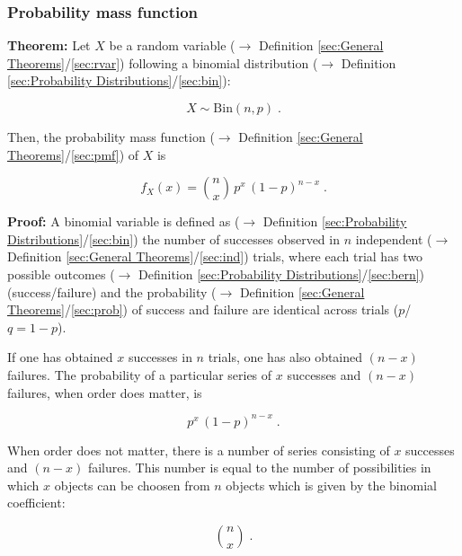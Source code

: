 \documentclass[a4paper,12pt,twoside]{book}
\begin{document}
\subsubsection[\textbf{Probability mass function}]{Probability mass function} \label{sec:bin-pmf}
\setcounter{equation}{0}

\textbf{Theorem:} Let $X$ be a random variable ($\rightarrow$ Definition \ref{sec:General Theorems}/\ref{sec:rvar}) following a binomial distribution ($\rightarrow$ Definition \ref{sec:Probability Distributions}/\ref{sec:bin}):

\begin{equation} \label{eq:bin-pmf-bin}
X \sim \mathrm{Bin}(n,p) \; .
\end{equation}

Then, the probability mass function ($\rightarrow$ Definition \ref{sec:General Theorems}/\ref{sec:pmf}) of $X$ is

\begin{equation} \label{eq:bin-pmf-bin-pmf}
f_X(x) = {n \choose x} \, p^x \, (1-p)^{n-x} \; .
\end{equation}


\vspace{1em}
\textbf{Proof:} A binomial variable is defined as ($\rightarrow$ Definition \ref{sec:Probability Distributions}/\ref{sec:bin}) the number of successes observed in $n$ independent ($\rightarrow$ Definition \ref{sec:General Theorems}/\ref{sec:ind}) trials, where each trial has two possible outcomes ($\rightarrow$ Definition \ref{sec:Probability Distributions}/\ref{sec:bern}) (success/failure) and the probability ($\rightarrow$ Definition \ref{sec:General Theorems}/\ref{sec:prob}) of success and failure are identical across trials ($p$/$q = 1-p$).

If one has obtained $x$ successes in $n$ trials, one has also obtained $(n-x)$ failures. The probability of a particular series of $x$ successes and $(n-x)$ failures, when order does matter, is

\begin{equation} \label{eq:bin-pmf-bin-prob}
p^x \, (1-p)^{n-x} \; .
\end{equation}

When order does not matter, there is a number of series consisting of $x$ successes and $(n-x)$ failures. This number is equal to the number of possibilities in which $x$ objects can be choosen from $n$ objects which is given by the binomial coefficient:

\begin{equation} \label{eq:bin-pmf-bin-coeff}
{n \choose x} \; .
\end{equation}
\end{document}
